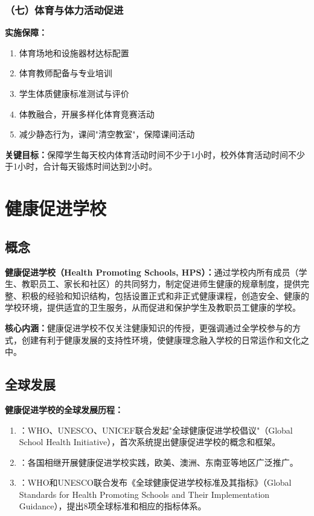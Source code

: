 \subsubsection{（七）体育与体力活动促进}

\begin{keybox}
\textbf{实施保障：}
\begin{enumerate}[leftmargin=*]
    \item 体育场地和设施器材达标配置
    \item 体育教师配备与专业培训
    \item 学生体质健康标准测试与评价
    \item 体教融合，开展多样化体育竞赛活动
    \item 减少静态行为，课间"清空教室"，保障课间活动
\end{enumerate}

\textbf{关键目标：}保障学生每天校内体育活动时间不少于1小时，校外体育活动时间不少于1小时，合计每天锻炼时间达到2小时。
\end{keybox}

\section{健康促进学校}

\subsection{概念}

\begin{defbox}
\textbf{健康促进学校（Health Promoting Schools, HPS）：}通过学校内所有成员（学生、教职员工、家长和社区）的共同努力，制定促进师生健康的规章制度，提供完整、积极的经验和知识结构，包括设置正式和非正式健康课程，创造安全、健康的学校环境，提供适宜的卫生服务，从而促进和保护学生及教职员工健康的学校。

\textbf{核心内涵：}健康促进学校不仅关注健康知识的传授，更强调通过全学校参与的方式，创建有利于健康发展的支持性环境，使健康理念融入学校的日常运作和文化之中。
\end{defbox}

\subsection{全球发展}

\begin{keybox}
\textbf{健康促进学校的全球发展历程：}
\begin{enumerate}[leftmargin=*]
    \item {}：WHO、UNESCO、UNICEF联合发起"全球健康促进学校倡议"（Global School Health Initiative），首次系统提出健康促进学校的概念和框架。
    \item {}：各国相继开展健康促进学校实践，欧美、澳洲、东南亚等地区广泛推广。
    \item {}：WHO和UNESCO联合发布《全球健康促进学校标准及其指标》（Global Standards for Health Promoting Schools and Their Implementation Guidance），提出8项全球标准和相应的指标体系。
\end{enumerate}
\end{keybox}

